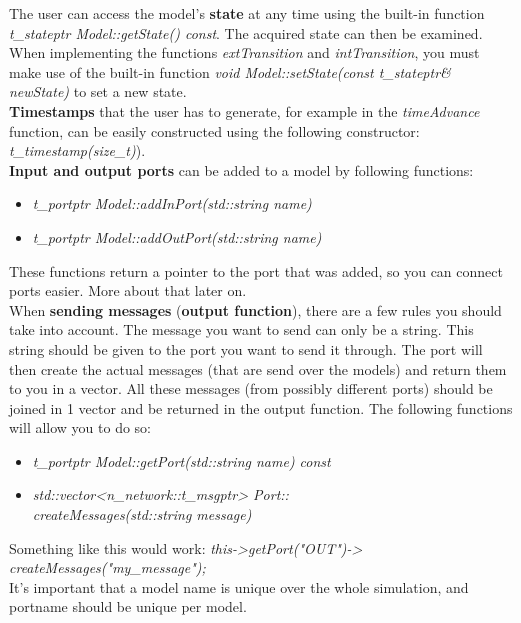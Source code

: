The user can access the model's \textbf{state} at any time using the built-in function \textsl{t\_stateptr Model::getState() const}. The acquired state can then be examined. When implementing the functions \textsl{extTransition} and \textsl{intTransition}, you must make use of the built-in function \textsl{void Model::setState(const t\_stateptr\& newState)} to set a new state.\\

\textbf{Timestamps} that the user has to generate, for example in the \textsl{timeAdvance} function, can be easily constructed using the following constructor:\\ \textsl{t\_timestamp(size\_t)}).\\

\textbf{Input and output ports} can be added to a model by following functions:
\begin{itemize}
	\item \textsl{t\_portptr Model::addInPort(std::string name)}
	\item \textsl{t\_portptr Model::addOutPort(std::string name)}
\end{itemize}
These functions return a pointer to the port that was added, so you can connect ports easier. More about that later on. \\

When \textbf{sending messages} (\textbf{output function}), there are a few rules you should take into account. The message you want to send can only be a string. This string should be given to the port you want to send it through. The port will then create the actual messages (that are send over the models) and return them to you in a vector. All these messages (from possibly different ports) should be joined in 1 vector and be returned in the output function. The following functions will allow you to do so:
\begin{itemize}
	\item \textsl{t\_portptr Model::getPort(std::string name) const}
	\item \textsl{std::vector{\textless}n\_network::t\_msgptr{\textgreater} Port:: \\createMessages(std::string message)}
\end{itemize} 
Something like this would work: \textsl{this-{\textgreater}getPort("OUT")-{\textgreater} \\createMessages("my\_message");} \\

It's important that a model name is unique over the whole simulation, and portname should be unique per model.\\

